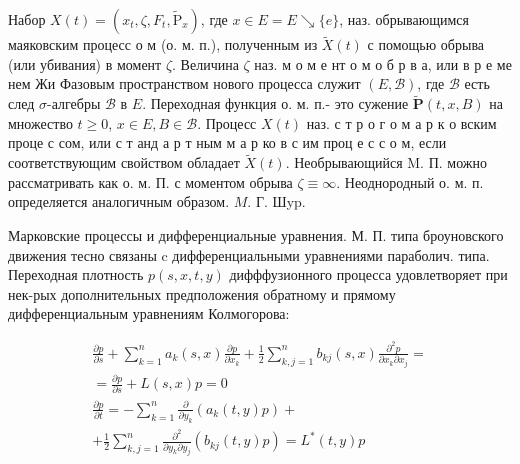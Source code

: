 \documentclass[10pt]{article}
\begin{document}
Набор $X(t)=\left(x_{t}, \zeta, F_{t}, \tilde{\mathrm{P}}_{x}\right)$, где $x \in E=E \searrow\{e\}$, наз. обрывающимся маяковским процесс о м (о. м. п.), полученным из $\tilde{X}(t)$ с помощью обрыва (или убивания) в момент $\zeta$. Величина $\zeta$ наз. м о м е нт о м о б р в а, или в р е ме нем Жи Фазовым пространством нового процесса служит $(E, \mathscr{B})$, где $\mathscr{B}$ есть след $\sigma$-алгебры $\mathscr{B}$ в $E$. Переходная функция о. м. п.- это сужение $\tilde{\boldsymbol{P}}(t, x, B)$ на множество $t \geqslant 0$, $x \in E, B \in \mathscr{B}$. Процесс $X(t)$ наз. с т р о г о м а р к о вским проце с сом, или с т анд а р т ным м а р ко в с им проц е с с о м, если соответствующим свойством обладает $\tilde{X}(t)$. Необрывающийся M. П. можно рассматривать как о. м. П. с моментом обрыва $\zeta \equiv \infty$. Неоднородный о. м. п. определяется аналогичным образом. $M$. Г. Шyp.



Марковские процессы и дифференциальные уравнения. М. П. типа броуновского движения тесно связаны c дифференциальными уравнениями параболич. типа. Переходная плотность $p(s, x, t, y)$ дифффузионного процесса удовлетворяет при нек-рых дополнительных предположения обратному и прямому дифференциальным уравнениям Колмогорова:



\[

\begin{gathered}

\frac{\partial p}{\partial s}+\sum_{k=1}^{n} a_{k}(s, x) \frac{\partial p}{\partial x_{k}}+\frac{1}{2} \sum_{k, j=1}^{n} b_{k j}(s, x) \frac{\partial^{2} p}{\partial x_{k} \partial x_{j}}= \\

=\frac{\partial p}{\partial s}+L(s, x) p=0 \\

\frac{\partial p}{\partial t}=-\sum_{k=1}^{n} \frac{\partial}{\partial y_{k}}\left(a_{k}(t, y) p\right)+ \\

+\frac{1}{2} \sum_{k, j=1}^{n} \frac{\partial^{2}}{\partial y_{k} \partial y_{j}}\left(b_{k j}(t, y) p\right)=L^{*}(t, y) p

\end{gathered}

\]
\end{document}
